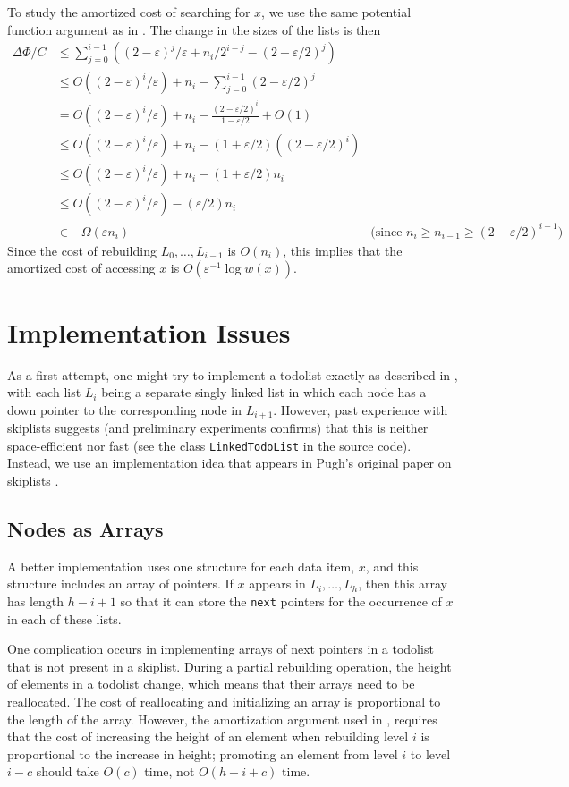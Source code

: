 \documentclass{patmorin}
\newcommand{\eps}{\varepsilon}
\begin{document}
To study the amortized cost of searching for $x$, we use the same
potential function argument as in .  The change in the sizes of the lists is then 
\begin{align*}
  \Delta\Phi/C & \le \sum_{j=0}^{i-1}\left((2-\eps)^j/\eps + n_i/2^{i-j} - (2-\eps/2)^j\right) \\
  & \le O((2-\eps)^i/\eps) + n_i - \sum_{j=0}^{i-1}(2-\eps/2)^j \\
  & = O((2-\eps)^i/\eps) + n_i - \frac{(2-\eps/2)^i}{1-\eps/2} + O(1) \\
  & \le O((2-\eps)^i/\eps) + n_i - (1+\eps/2)((2-\eps/2)^i) \\
  & \le O((2-\eps)^i/\eps) + n_i - (1+\eps/2)n_i \\
  & \le O((2-\eps)^i/\eps) - (\eps/2)n_i \\
  & \in - \Omega(\eps n_i) & \text{(since $n_i \ge n_{i-1} \ge (2-\eps/2)^{i-1}$)}
\end{align*}
Since the cost of rebuilding $L_0,\ldots,L_{i-1}$ is $O(n_i)$, this implies that the amortized cost of accessing $x$ is $O(\eps^{-1}\log w(x))$.


\section{Implementation Issues}


As a first attempt, one might try to implement a todolist exactly
as described in , with each list $L_i$ being a
separate singly linked list in which each node has a down pointer to
the corresponding node in $L_{i+1}$.  However, past experience with
skiplists suggests (and preliminary experiments confirms) that this is
neither space-efficient nor fast (see the class \texttt{LinkedTodoList}
in the source code). Instead, we use an implementation idea that appears in
Pugh's original paper on skiplists \cite{pugh:skip}.

\subsection{Nodes as Arrays}

A better implementation uses one structure for each data item, $x$,
and this structure includes an array of pointers.  If $x$ appears in
$L_{i},\ldots,L_h$, then this array has length $h-i+1$ so that it can
store the \texttt{next} pointers for the occurrence of $x$ in each of
these lists.  

One complication occurs in implementing arrays of next pointers in a
todolist that is not present in a skiplist.  During a partial rebuilding
operation, the height of elements in a todolist change, which means
that their arrays need to be reallocated.  The cost of reallocating and
initializing an array is proportional to the length of the array. However,
the amortization argument used in , requires that the
cost of increasing the height of an element when rebuilding level $i$
is proportional to the increase in height; promoting an element from
level $i$ to level $i-c$ should take $O(c)$ time, not $O(h - i + c)$ time.
\end{document}
